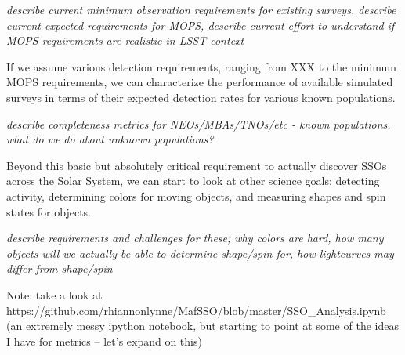 {\it describe current minimum observation requirements for existing
  surveys, describe current expected requirements for MOPS, describe
  current effort to understand if MOPS requirements are realistic in
  LSST context}

If we assume various detection requirements, ranging from XXX to the
minimum MOPS requirements, we can characterize the performance of
available simulated surveys in terms of their expected detection rates
for various known populations.

{\it describe completeness metrics for NEOs/MBAs/TNOs/etc - known
  populations. what do we do about unknown populations?}

Beyond this basic but absolutely critical requirement to actually
discover SSOs across the Solar System, we can start to look at other
science goals: detecting activity, determining colors for moving
objects, and measuring shapes and spin states for objects. 

{\it describe requirements and challenges for these; why colors are
  hard, how many objects will we actually be able to determine
  shape/spin for, how lightcurves may differ from shape/spin}

Note: take a look at
https://github.com/rhiannonlynne/MafSSO/blob/master/SSO_Analysis.ipynb
(an extremely messy ipython notebook, but starting to point at some of
the ideas I have for metrics -- let's expand on this)